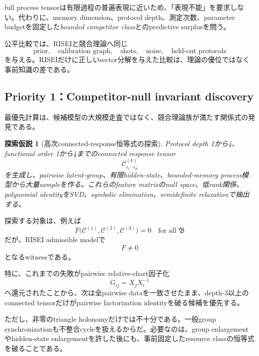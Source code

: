 \documentclass[11pt,a4paper,uplatex,dvipdfmx]{bxjsarticle}
\newtheorem{proposal}[definition]{探索仮説}
\theoremstyle{remark}
\newcommand{\cC}{\mathcal C}
\begin{document}
full process tensorは有限過程の普遍表現に近いため、「表現不能」を要求しない。代わりに、memory dimension、protocol depth、測定次数、parameter budgetを固定した\emph{bounded competitor class}とのpredictive surplusを問う。

公平比較では、RISEIと競合理論へ同じ
\begin{equation}
\text{prior},\quad
\text{calibration graph},\quad
\text{shots},\quad
\text{noise},\quad
\text{held-out protocols}
\end{equation}
を与える。RISEIだけに正しいsector分解を与えた比較は、理論の優位ではなく事前知識の差である。

\subsection{Priority 1：Competitor-null invariant discovery}

最優先計算は、候補模型の大規模走査ではなく、競合理論族が満たす関係式の発見である。

\begin{proposal}[高次connected-response恒等式の探索]
Protocol depth 1から4、functional order 1から4までのconnected response tensor
\begin{equation}
\cC^{(k)}_{i_1\cdots i_d}
\end{equation}
を生成し、pairwise latent-group、有限hidden-state、bounded-memory process模型から大量sampleを作る。これらのfeature matrixのnull space、低rank関係、polynomial identityをSVD、symbolic elimination、semidefinite relaxationで抽出する。
\end{proposal}

探索する対象は、例えば
\begin{equation}
F\bigl(\cC^{(1)},\cC^{(2)},\cC^{(3)}\bigr)=0
\quad\text{for all }\mathfrak B
\end{equation}
だが、RISEI admissible modelで
\begin{equation}
F\neq0
\end{equation}
となるwitnessである。

特に、これまでの失敗がpairwise relative-chart因子化
\begin{equation}
G_{ij}=X_jX_i^{-1}
\end{equation}
へ還元されたことから、次は全pairwise dataを一致させたまま、depth-3以上のconnected tensorだけがpairwise factorization identityを破る候補を優先する。

ただし、非零のtriangle holonomyだけでは不十分である。一般group synchronizationも不整合cycleを扱えるからだ。必要なのは、group enlargementやhidden-state enlargementを許した後にも、事前固定したresource classの恒等式を破ることである。
\end{document}
